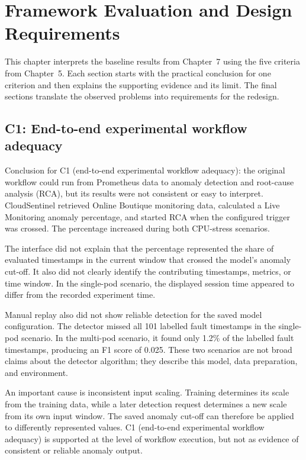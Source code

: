 \chapter{Framework Evaluation and Design Requirements}
\label{ch:framework_evaluation_and_design_requirements}
This chapter interprets the baseline results from Chapter~7 using the five criteria from Chapter~5. Each section starts with the practical conclusion for one criterion and then explains the supporting evidence and its limit. The final sections translate the observed problems into requirements for the redesign.

\section{C1: End-to-end experimental workflow adequacy}
Conclusion for C1 (end-to-end experimental workflow adequacy): the original workflow could run from Prometheus data to anomaly detection and root-cause analysis (RCA), but its results were not consistent or easy to interpret. CloudSentinel retrieved Online Boutique monitoring data, calculated a Live Monitoring anomaly percentage, and started RCA when the configured trigger was crossed. The percentage increased during both CPU-stress scenarios.

The interface did not explain that the percentage represented the share of evaluated timestamps in the current window that crossed the model's anomaly cut-off. It also did not clearly identify the contributing timestamps, metrics, or time window. In the single-pod scenario, the displayed session time appeared to differ from the recorded experiment time.

Manual replay also did not show reliable detection for the saved model configuration. The detector missed all 101 labelled fault timestamps in the single-pod scenario. In the multi-pod scenario, it found only 1.2\% of the labelled fault timestamps, producing an F1 score of 0.025. These two scenarios are not broad claims about the detector algorithm; they describe this model, data preparation, and environment.

An important cause is inconsistent input scaling. Training determines its scale from the training data, while a later detection request determines a new scale from its own input window. The saved anomaly cut-off can therefore be applied to differently represented values. C1 (end-to-end experimental workflow adequacy) is supported at the level of workflow execution, but not as evidence of consistent or reliable anomaly output.

